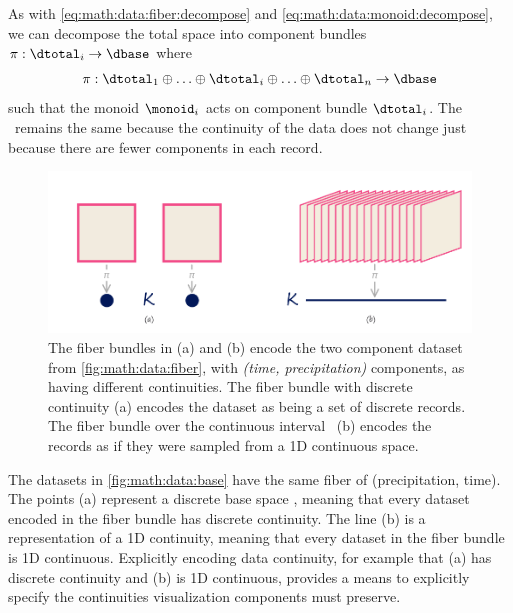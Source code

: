 \documentclass[../main.tex]{subfiles}
\begin{document}
As with \autoref{eq:math:data:fiber:decompose} and \autoref{eq:math:data:monoid:decompose}, we can decompose the total space into component bundles \(\pi:\dtotal_i\rightarrow \dbase\) where
\begin{equation}
    \label{eq:math:data:base:decompose}
    \pi:\dtotal_1\oplus\ldots\oplus \dtotal_i \oplus\ldots \oplus \dtotal_n \rightarrow \dbase
\end{equation}
such that the monoid \(\monoid_{i}\) acts on component bundle \(\dtotal_i\). The \dbase\ remains the same because the continuity of the data does not change just because there are fewer components in each record.

\begin{figure}[H]
    \includegraphics[width=1\textwidth]{figures/math/base.png}
    \caption{The fiber bundles in (a) and (b) encode the two component dataset from \autoref{fig:math:data:fiber}, with \textit{(time, precipitation)} components, as having different continuities. The fiber bundle with discrete continuity (a) encodes the dataset as being a set of discrete records. The fiber bundle over the continuous interval \dbase\ (b) encodes the records as if they were sampled from a 1D continuous space.} 
    \label{fig:math:data:base}
\end{figure}

The datasets in \autoref{fig:math:data:base} have the same fiber of (precipitation, time). The points (a) represent a discrete base space \dbase, meaning that every dataset encoded in the fiber bundle has discrete continuity. The line (b) is a representation of a 1D continuity, meaning that every dataset in the fiber bundle is 1D continuous. Explicitly encoding data continuity, for example that (a) has discrete continuity and (b) is 1D continuous, provides a means to explicitly specify the continuities visualization components must preserve. 
 
\end{document}
